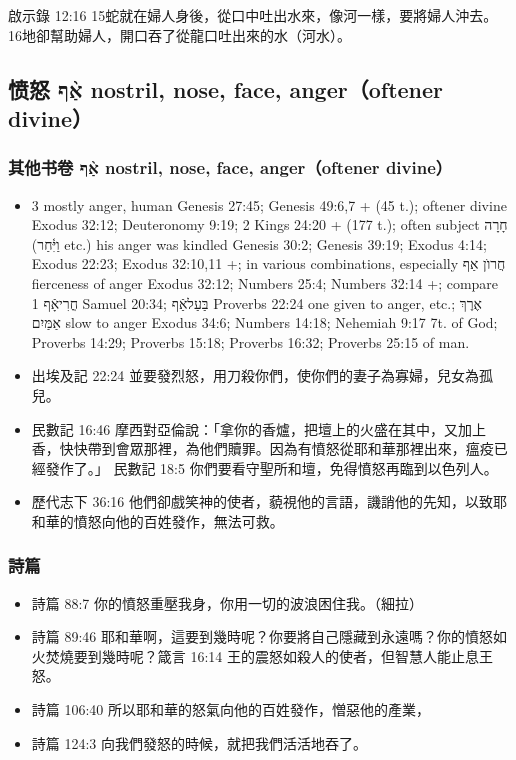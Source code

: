 啟示錄 12:16
15蛇就在婦人身後，從口中吐出水來，像河一樣，要將婦人沖去。 16地卻幫助婦人，開口吞了從龍口吐出來的水（河水）。
  
  




\subsection{愤怒 אַ֨ף  nostril, nose, face, anger（oftener divine）}
\subsubsection{其他书卷 אַ֨ף  nostril, nose, face, anger（oftener divine）}
\begin{itemize} 
\itemsep-.25em
\item 3 mostly anger, human Genesis 27:45; Genesis 49:6,7 + (45 t.); oftener divine Exodus 32:12; Deuteronomy 9:19; 2 Kings 24:20 + (177 t.); often subject חָרָה (וַיִּ֫חַר etc.) his anger was kindled Genesis 30:2; Genesis 39:19; Exodus 4:14; Exodus 22:23; Exodus 32:10,11 +; in various combinations, especially חֲרוֺן אַף fierceness of anger Exodus 32:12; Numbers 25:4; Numbers 32:14 +; compare חֳרִיאָֿף 1 Samuel 20:34; בַּעַלאַֿף Proverbs 22:24 one given to anger, etc.; אֶרֶךְ אַמַּיִם slow to anger Exodus 34:6; Numbers 14:18; Nehemiah 9:17 7t. of God; Proverbs 14:29; Proverbs 15:18; Proverbs 16:32; Proverbs 25:15 of man.
\item 出埃及記 22:24 並要發烈怒，用刀殺你們，使你們的妻子為寡婦，兒女為孤兒。
\item 民數記 16:46 摩西對亞倫說：「拿你的香爐，把壇上的火盛在其中，又加上香，快快帶到會眾那裡，為他們贖罪。因為有憤怒從耶和華那裡出來，瘟疫已經發作了。」
民數記 18:5 你們要看守聖所和壇，免得憤怒再臨到以色列人。
\item 歷代志下 36:16 他們卻戲笑神的使者，藐視他的言語，譏誚他的先知，以致耶和華的憤怒向他的百姓發作，無法可救。
\end{itemize}  

\subsubsection{詩篇}
\begin{itemize} 
\itemsep-.25em
\item 詩篇 88:7 你的憤怒重壓我身，你用一切的波浪困住我。（細拉）
\item 詩篇 89:46 耶和華啊，這要到幾時呢？你要將自己隱藏到永遠嗎？你的憤怒如火焚燒要到幾時呢？箴言 16:14 王的震怒如殺人的使者，但智慧人能止息王怒。
\item 詩篇 106:40 所以耶和華的怒氣向他的百姓發作，憎惡他的產業，
\item 詩篇 124:3 向我們發怒的時候，就把我們活活地吞了。
\end{itemize}  

